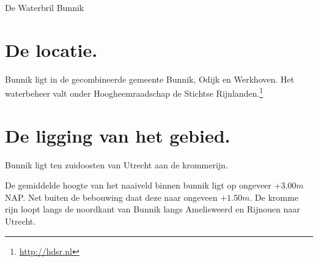 De Waterbril Bunnik

\section{De locatie.}
Bunnik ligt in de gecombineerde gemeente Bunnik, Odijk en Werkhoven.
Het waterbeheer valt onder Hoogheemraadschap de Stichtse Rijnlanden.\footnote{\url{http://hdsr.nl}}

\section{De ligging van het gebied.}
Bunnik ligt ten zuidoosten van Utrecht aan de krommerijn.

De gemiddelde hoogte van het naaiveld binnen bunnik ligt op ongeveer $+3.00 m$ NAP.
Net buiten de bebouwing daat deze naar ongeveen $+1.50 m$.
De kromme rijn loopt langs de noordkant van Bunnik langs Amelisweerd en Rijnouen naar Utrecht.
